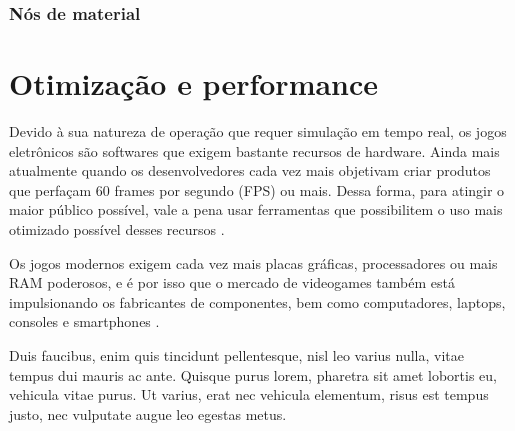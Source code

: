 \subsubsection{Nós de material}
\label{sec:shaderlab}

\section{Otimização e performance}
\label{sec:otimizacao-performance}

Devido à sua natureza de operação que requer simulação em tempo real, os jogos eletrônicos são softwares que exigem bastante recursos de hardware. Ainda mais atualmente quando os desenvolvedores cada vez mais objetivam criar produtos que perfaçam 60 frames por segundo (FPS) ou mais. Dessa forma, para atingir o maior público possível, vale a pena usar ferramentas que possibilitem o uso mais otimizado possível desses recursos \cite{comparacaoDesempenho}.

Os jogos modernos exigem cada vez mais placas gráficas, processadores ou mais RAM poderosos, e é por isso que o mercado de videogames também está impulsionando os fabricantes de componentes, bem como computadores, laptops, consoles e smartphones \cite{comparacaoDesempenho2}.

	\begin{table}[h!]	
		\centering
	\end{table}

Duis faucibus, enim quis tincidunt pellentesque, nisl leo varius nulla, vitae tempus dui mauris ac ante. Quisque purus lorem, pharetra sit amet lobortis eu, vehicula vitae purus. Ut varius, erat nec vehicula elementum, risus est tempus justo, nec vulputate augue leo egestas metus.

